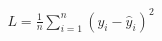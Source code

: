 \documentclass[preview]{standalone}
\begin{document}
\begin{align*}
L = \frac{1}{n}\sum_{i=1}^{n} \left(y_i - \hat{y}_i\right)^2
\end{align*}
\end{document}
